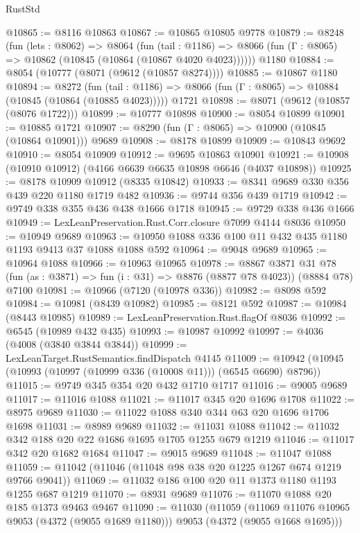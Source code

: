 \begin{lexlean}{RustStd}
\begin{coremodule}
@10865 := @8116 @10863
@10867 := @10865 @10805 @9778
@10879 := @8248
    (fun (lets : @8062) =>
    @8064
      (fun (tail : @1186) =>
      @8066 (fun (Γ : @8065) => @10862 (@10845 (@10864 (@10867 @4020 @4023))))))
    @1180
@10884 := @8054 (@10777 (@8071 (@9612 (@10857 @8274))))
@10885 := @10867 @1180
@10894 := @8272
    (fun (tail : @1186) => @8066 (fun (Γ : @8065) => @10884 (@10845 (@10864 (@10885 @4023)))))
    @1721
@10898 := @8071 (@9612 (@10857 (@8076 @1722)))
@10899 := @10777 @10898
@10900 := @8054 @10899
@10901 := @10885 @1721
@10907 := @8290 (fun (Γ : @8065) => @10900 (@10845 (@10864 @10901))) @9689
@10908 := @8178 @10899
@10909 := @10843 @9692
@10910 := @8054 @10909
@10912 := @9695 @10863 @10901
@10921 := @10908 (@10910 @10912) (@4166 @6639 @6635 @10898 @6646 (@4037 @10898))
@10925 := @8178 @10909 @10912 (@8335 @10842)
@10933 := @8341 @9689 @330 @356 @439 @220 @1180 @1719 @482
@10936 := @9744 @356 @439 @1719
@10942 := @9749 @338 @355 @436 @438 @1666 @1718
@10945 := @9729 @338 @436 @1666
@10949 := LexLeanPreservation.Rust.Corr.closure @7099 @4144 @8036
@10950 := @10949 @9689
@10963 := @10950 @1088 @336 @100 @11 @432 @435 @1180 @1193 @9413 @37 @1088 @1088 @592
@10964 := @9048 @9689
@10965 := @10964 @1088
@10966 := @10963 @10965
@10978 := @8867
    @3871
    @31
    @78
    (fun (as : @3871) => fun (i : @31) => @8876 (@8877 @78 @4023))
    (@8884 @78)
    @7100
@10981 := @10966 (@7120 (@10978 @336))
@10982 := @8098 @592
@10984 := @10981 (@8439 @10982)
@10985 := @8121 @592
@10987 := @10984 (@8443 @10985)
@10989 := LexLeanPreservation.Rust.flagOf @8036
@10992 := @6545 (@10989 @432 @435)
@10993 := @10987 @10992
@10997 := @4036 (@4008 (@3840 @3844 @3844))
@10999 := LexLeanTarget.RustSemantics.findDispatch @4145
@11009 := @10942 (@10945 (@10993 (@10997 (@10999 @336 (@10008 @11))) (@6545 @6690) @8796))
@11015 := @9749 @345 @354 @20 @432 @1710 @1717
@11016 := @9005 @9689
@11017 := @11016 @1088
@11021 := @11017 @345 @20 @1696 @1708
@11022 := @8975 @9689
@11030 := @11022 @1088 @340 @344 @63 @20 @1696 @1706 @1698
@11031 := @8989 @9689
@11032 := @11031 @1088
@11042 := @11032 @342 @188 @20 @22 @1686 @1695 @1705 @1255 @679 @1219
@11046 := @11017 @342 @20 @1682 @1684
@11047 := @9015 @9689
@11048 := @11047 @1088
@11059 := @11042 (@11046 (@11048 @98 @38 @20 @1225 @1267 @674 @1219 @9766 @9041))
@11069 := @11032 @186 @100 @20 @11 @1373 @1180 @1193 @1255 @687 @1219
@11070 := @8931 @9689
@11076 := @11070 @1088 @20 @185 @1373 @9463 @9467
@11090 := @11030
    (@11059
      (@11069 @11076 @10965 @9053 (@4372 (@9055 @1689 @1180)))
      @9053
      (@4372 (@9055 @1668 @1695)))

\end{coremodule}
\end{lexlean}
